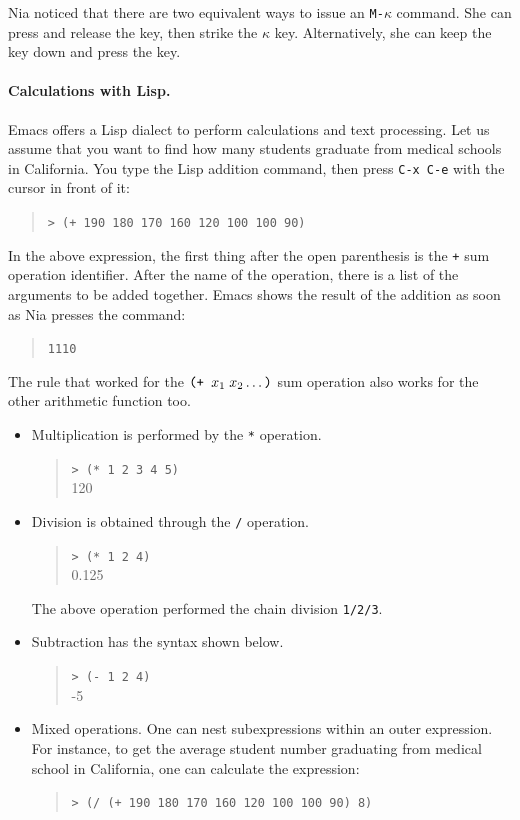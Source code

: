 \documentclass[a4paper,12pt]{book}
\begin{document}
Nia noticed that there are two equivalent ways to
issue an \verb|M-|$\kappa$ command. She can
press and release the  key, then
strike the  $\kappa$ key. Alternatively, she
can keep the  key down and press
the \keys{$\kappa$} key.

\paragraph{Calculations with Lisp.} Emacs
offers a Lisp dialect to perform calculations
and text processing. Let us assume that you
want to find how many students graduate from
medical schools in California. You type the Lisp
addition command, then press \verb|C-x C-e| with
the cursor in front of it:
\begin{quote}
\verb|> (+ 190 180 170 160 120 100 100 90)|
\end{quote}
In the above expression, the first thing after
the open parenthesis is the \verb|+| sum
operation identifier. After the name of
the operation, there is a list of
the arguments to be added together.
Emacs shows the result of the addition as soon as
Nia presses the  command:
\begin{quote}
\verb|1110|
\end{quote}
The rule that worked for  the $\verb|(+ | x_1\;x_2\ldots\verb|)|$
sum operation also works for the  other arithmetic function too.
\begin{itemize}
  \item{Multiplication} is performed
by the \verb|*| operation.
\begin{quote}
\verb|> (* 1 2 3 4 5)|\\
120
\end{quote}
\item{Division} is obtained through the \verb|/| operation.
\begin{quote}
\verb|> (* 1 2 4)|\\
0.125
\end{quote}
The above operation performed the chain
division \verb|1/2/3|.
\item{Subtraction} has the syntax shown below.
\begin{quote}
\verb|> (- 1 2 4)|\\
-5
\end{quote}
\item Mixed operations. One can nest subexpressions
  within an outer expression. For instance,
  to get the average student number graduating
  from medical school in California, one can
  calculate the expression:
\begin{quote}
\verb|> (/ (+ 190 180 170 160 120 100 100 90) 8)|
\end{quote}

\end{itemize}
\end{document}
